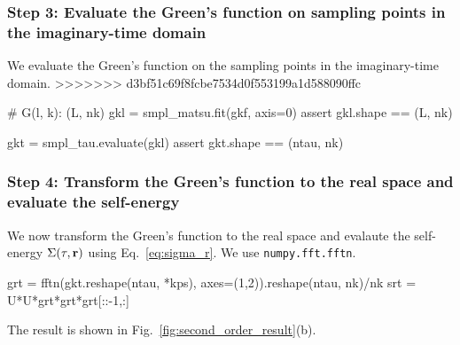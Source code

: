 \documentclass[submission, LectureNotes]{SciPost}
\newcommand{\bk}{\ensuremath{{\bf k}}}
\newcommand{\br}{\ensuremath{{\bf r}}}
\newcommand\ii{\mathrm{i}}%
\newcommand\iv{\ii\nu}%
\begin{document}
\subsubsection*{Step 3: Evaluate the Green's function on sampling points in the imaginary-time domain}
We evaluate the Green's function on the sampling points in the imaginary-time domain.
>>>>>>> d3bf51c69f8fcbe7534d0f553199a1d588090ffc
\begin{python}
# G(l, k): (L, nk)
gkl = smpl_matsu.fit(gkf, axis=0)
assert gkl.shape == (L, nk)

gkt = smpl_tau.evaluate(gkl)
assert gkt.shape == (ntau, nk)
\end{python}

%

\subsubsection*{Step 4: Transform the Green's function to the real space and evaluate the self-energy}
We now transform the Green's function to the real space and evalaute the self-energy $\Sigma(\tau, \br)$
using Eq.~\eqref{eq:sigma_r}.
We use \texttt{numpy.fft.fftn}.
\begin{python}
grt = fftn(gkt.reshape(ntau, *kps), axes=(1,2)).reshape(ntau, nk)/nk
srt = U*U*grt*grt*grt[::-1,:]
\end{python}
The result is shown in Fig.~\ref{fig:second_order_result}(b).
\end{document}
